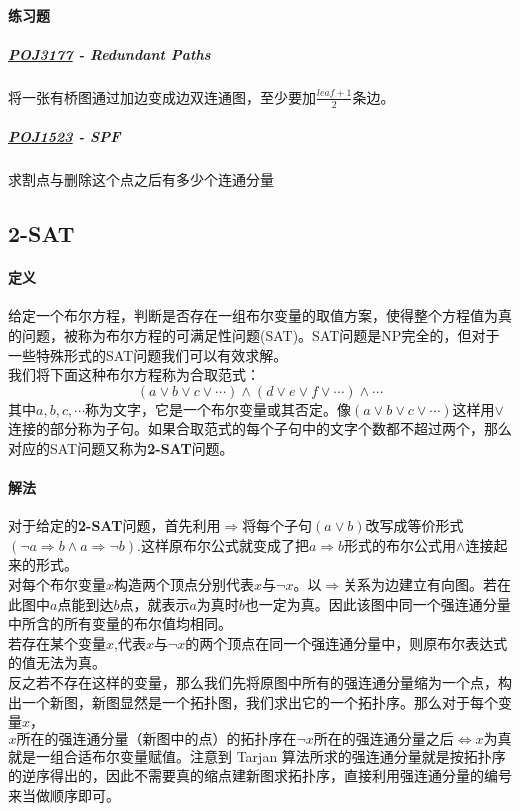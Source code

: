 \documentclass[]{cpp}
\begin{document}
	\paragraph{练习题}
	\subparagraph{\href{http://poj.org/problem?id=3177}{POJ3177} - Redundant Paths}
	将一张有桥图通过加边变成边双连通图，至少要加$\frac{leaf+1}{2}$条边。
	\subparagraph{\href{http://poj.org/problem?id=1523}{POJ1523} - SPF}
	求割点与删除这个点之后有多少个连通分量
	\subsection{2-SAT}
	\paragraph{定义}
	给定一个布尔方程，判断是否存在一组布尔变量的取值方案，使得整个方程值为真的问题，被称为布尔方程的可满足性问题(SAT)。SAT问题是NP完全的，但对于一些特殊形式的SAT问题我们可以有效求解。\\
	我们将下面这种布尔方程称为合取范式：
	$$(a\lor b\lor c\lor\cdots)\land(d\lor e\lor f\lor\cdots)\land\cdots$$
	其中$a,b,c,\cdots$称为文字，它是一个布尔变量或其否定。像$(a\lor b\lor c\lor\cdots)$这样用$\lor$连接的部分称为子句。如果合取范式的每个子句中的文字个数都不超过两个，那么对应的SAT问题又称为\textbf{2-SAT}问题。
	\paragraph{解法}
	对于给定的\textbf{2-SAT}问题，首先利用$\Rightarrow$将每个子句$(a\lor b)$改写成等价形式$(\neg a\Rightarrow b\land a\Rightarrow\neg b)$.这样原布尔公式就变成了把$a\Rightarrow b$形式的布尔公式用$\land$连接起来的形式。\\
	对每个布尔变量$x$构造两个顶点分别代表$x$与$\neg x$。以$\Rightarrow$关系为边建立有向图。若在此图中$a$点能到达$b$点，就表示$a$为真时$b$也一定为真。因此该图中同一个强连通分量中所含的所有变量的布尔值均相同。\\
	若存在某个变量$x$,代表$x$与$\neg x$的两个顶点在同一个强连通分量中，则原布尔表达式的值无法为真。\\
	反之若不存在这样的变量，那么我们先将原图中所有的强连通分量缩为一个点，构出一个新图，新图显然是一个拓扑图，我们求出它的一个拓扑序。那么对于每个变量$x$，\textbf{$$x\text{所在的强连通分量（新图中的点）的拓扑序在}\neg x\text{所在的强连通分量之后}\Leftrightarrow x\text{为真}$$}就是一组合适布尔变量赋值。注意到 Tarjan 算法所求的强连通分量就是按拓扑序的逆序得出的，因此不需要真的缩点建新图求拓扑序，直接利用强连通分量的编号来当做顺序即可。
\end{document}
